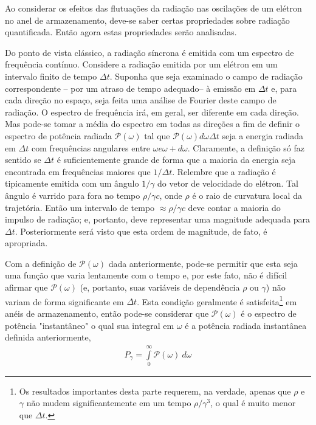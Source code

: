 Ao considerar os efeitos das flutuações da radiação nas oscilações de um elétron no anel de armazenamento, deve-se saber certas propriedades sobre radiação quantificada. Então agora estas propriedades serão analisadas.

Do ponto de vista clássico, a radiação síncrona é emitida com um espectro de frequência contínuo. Considere a radiação emitida por um elétron em um intervalo finito de tempo $\Delta t$. Suponha que seja examinado o campo de radiação correspondente -- por um atraso de tempo adequado-- à emissão em $\Delta t$ e, para cada direção no espaço, seja feita uma análise de Fourier deste campo de radiação. O espectro de frequência irá, em geral, ser diferente em cada direção. Mas pode-se tomar a média do espectro em todas as direções a fim de definir o espectro de potência radiada $\mathscr{P}(\omega)$ tal que $\mathscr{P}(\omega)d\omega \Delta t$ seja a energia radiada em $\Delta t$ com frequências angulares entre $\omega e \omega+d\omega$. Claramente, a definição só faz sentido se $\Delta t$ é suficientemente grande de forma que a maioria da energia seja encontrada em frequências maiores que $1/\Delta t$. Relembre que a radiação é tipicamente emitida com um ângulo $1/\gamma$ do vetor de velocidade do elétron. Tal ângulo é varrido para fora no tempo $\rho/\gamma c$, onde $\rho$ é o raio de curvatura local da trajetória. Então um intervalo de tempo $\approx \rho/\gamma c$ deve contar a maioria do impulso de radiação; e, portanto, deve representar uma magnitude adequada para $\Delta t$. Posteriormente será visto que esta ordem de magnitude, de fato, é apropriada.

Com a definição de $\mathscr{P}(\omega)$ dada anteriormente, pode-se permitir que esta seja uma função que varia lentamente com o tempo e, por este fato, não é difícil afirmar que $\mathscr{P}(\omega)$ (e, portanto, suas variáveis de dependência $\rho$ ou $\gamma$) não variam de forma significante em $\Delta t$. Esta condição geralmente é satisfeita\footnote{Os resultados importantes desta parte requerem, na verdade, apenas que $\rho$ e $\gamma$ não mudem significantemente em um tempo $\rho/\gamma^3$, o qual é muito menor que $\Delta t$.} em anéis de armazenamento, então pode-se considerar que $\mathscr{P}(\omega)$ é o espectro de potência "instantâneo" o qual sua integral em $\omega$ é a potência radiada instantânea definida anteriormente,
\begin{align}
	P_\gamma = \int\limits_{0}^{\infty}\mathscr{P}(\omega)\ d\omega
\end{align}

